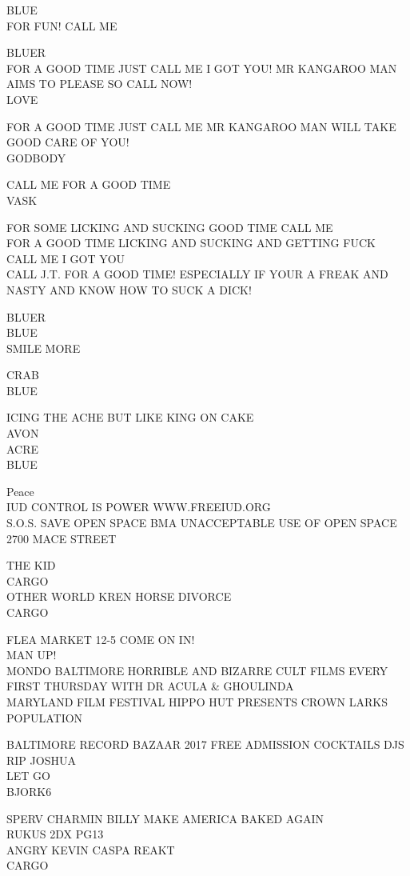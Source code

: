 \documentclass[10pt,letterpaper]{article}
\begin{document}
BLUE\\
FOR FUN!  CALL ME

BLUER\\
FOR A GOOD TIME JUST CALL ME I GOT YOU!  MR KANGAROO MAN AIMS TO PLEASE SO CALL NOW!\\
LOVE

FOR A GOOD TIME JUST CALL ME MR KANGAROO MAN WILL TAKE GOOD CARE OF YOU!\\
GODBODY

CALL ME FOR A GOOD TIME\\
VASK

FOR SOME LICKING AND SUCKING GOOD TIME CALL ME\\
FOR A GOOD TIME LICKING AND SUCKING AND GETTING FUCK CALL ME I GOT YOU\\
CALL J.T. FOR A GOOD TIME!   ESPECIALLY IF YOUR A FREAK AND NASTY AND KNOW HOW TO SUCK A DICK!

BLUER\\
BLUE\\
SMILE MORE

CRAB\\
BLUE

ICING THE ACHE BUT LIKE KING ON CAKE\\
AVON\\
ACRE\\
BLUE

Peace\\
IUD CONTROL IS POWER WWW.FREEIUD.ORG\\
S.O.S. SAVE OPEN SPACE BMA UNACCEPTABLE USE OF OPEN SPACE 2700 MACE STREET

THE KID\\
CARGO\\
OTHER WORLD KREN HORSE DIVORCE\\
CARGO

FLEA MARKET 12{-}5 COME ON IN!\\
MAN UP!\\
MONDO BALTIMORE HORRIBLE AND BIZARRE CULT FILMS EVERY FIRST THURSDAY WITH DR ACULA \& GHOULINDA\\
MARYLAND FILM FESTIVAL HIPPO HUT PRESENTS CROWN LARKS POPULATION

BALTIMORE RECORD BAZAAR 2017 FREE ADMISSION COCKTAILS DJS\\
RIP JOSHUA\\
LET GO\\
BJORK6

SPERV CHARMIN BILLY MAKE AMERICA BAKED AGAIN\\
RUKUS 2DX PG13\\
ANGRY KEVIN CASPA REAKT\\
CARGO
\end{document}
